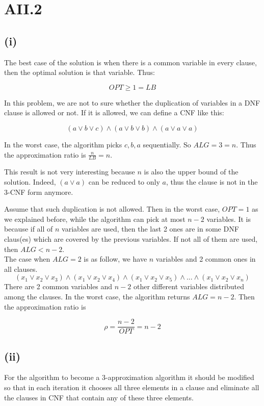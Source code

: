 \section* {AII.2}
\label {a2-2}
\subsection*{(i)}

The best case of the solution is when there is a common variable in every clause, then the optimal solution is that variable. Thus:

$$ OPT \ge 1 = LB $$

In this problem, we are not to sure whether the duplication of variables in a DNF clause is allowed or not. If it is allowed, we can define a CNF like this:

$$(a \vee b \vee c) \wedge (a \vee b \vee b) \wedge (a \vee a \vee a) $$

In the worst case, the algorithm picks $c, b, a$ sequentially. So $ALG = 3 = n$. Thus the approximation ratio is $\frac{n}{LB} = n$.

This result is not very interesting because $n$ is also the upper bound of the solution. Indeed, $(a \vee a)$ can be reduced to only $a$, thus the clause is not in the 3-CNF form anymore.

Assume that such duplication is not allowed. Then in the worst case, $OPT = 1$ as we explained before, while the algorithm can pick at most $n-2$ variables. It is because if all of $n$ variables are used, then the last 2 ones are in some DNF claus(es) which are covered by the previous variables. If not all of them are used, then $ALG < n-2$. \\

The case when $ALG = 2$ is as follow, we have $n$ variables and 2 common ones in all clauses.
$$ (x_1 \vee x_2  \vee x_3) \wedge (x_1 \vee x_2 \vee x_4) \wedge (x_1 \vee x_2 \vee x_5) \wedge ... \wedge (x_1 \vee x_2 \vee x_n) $$
There are 2 common variables and $n-2$ other different variables distributed among the clauses. In the worst case, the algorithm returns $ALG = n-2 $. Then the approximation ratio is

$$\rho = \frac{n-2}{OPT} = n-2$$

\subsection*{(ii)}
For the algorithm to become a 3-approximation algorithm it should be modified so that in each iteration it chooses all three elements in a clause and eliminate all the clauses in CNF that contain any of these three elements.\\

